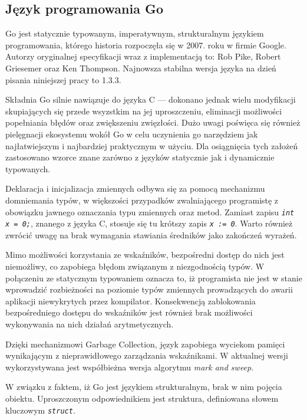 \subsection{Język programowania Go} %
\label{ss_internals_go}
\par{
Go jest statycznie typowanym, imperatywnym, strukturalnym językiem programowania, którego historia rozpoczęła się w 2007. roku w firmie Google. Autorzy oryginalnej specyfikacji wraz z implementacją to: Rob Pike, Robert Griesemer oraz Ken Thompson.
Najnowsza stabilna wersja języka na dzień pisania niniejszej pracy to 1.3.3.
}
\par{
Składnia Go silnie nawiązuje do języka C --- dokonano jednak wielu modyfikacji skupiających się przede wsyzstkim na jej uproszczeniu, eliminacji możliwości popełniania błędów oraz zwiększeniu zwięzłości.
Dużo uwagi poświęca się również pielęgnacji ekosystemu wokół Go w celu uczynienia go narzędziem jak najłatwiejszym i najbardziej praktycznym w użyciu.
Dla osiągnięcia tych założeń zastosowano wzorce znane zarówno z języków statycznie jak i dynamicznie typowanych.
}
\par{Deklaracja i inicjalizacja zmiennych odbywa się za pomocą mechanizmu domniemania typów, w większości przypadków zwalniającego programistę z obowiązku jawnego oznaczania typu zmiennych oraz metod. Zamiast zapisu \textit{\lstinline{int x = 0;}}, znanego z języka C, stosuje się tu krótszy zapis \textit{\lstinline{x := 0}}. Warto również zwrócić uwagę na brak wymagania stawiania średników jako zakończeń wyrażeń.
}
 \par{Mimo możliwości korzystania ze wskaźników, bezpośredni dostęp do nich jest niemożliwy, co zapobiega błędom związanym z niezgodnością typów. W połączeniu ze statycznym typowaniem oznacza to, iż programista nie jest w stanie wprowadzić rozbieżności na poziomie typów zmiennych prowadzących do awarii aplikacji niewykrytych przez kompilator. Konsekwencją zablokowania bezpośredniego dostępu do wskaźników jest również brak możliwości wykonywania na nich działań arytmetycznych.
 }
 \par{
Dzięki mechanizmowi Garbage Collection, język zapobiega wyciekom pamięci wynikającym z nieprawidłowego zarządzania wskaźnikami. W aktualnej wersji wykorzystywana jest współbieżna wersja algorytmu \textit{mark and sweep}.
}
\par{
 W związku z faktem, iż Go jest językiem strukturalnym, brak w nim pojęcia obiektu. Uproszczonym odpowiednikiem jest struktura, definiowana słowem kluczowym \textit{\lstinline{struct}}.
}
